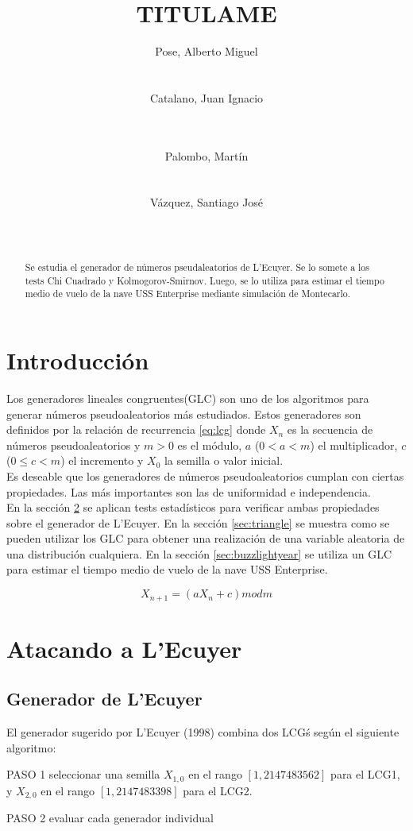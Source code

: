 \documentclass{sig-alternate}
\title{TITULAME}
\author{
\alignauthor
Pose, Alberto Miguel\\
       \affaddr{Instituto Tecnol\'ogico de Buenos Aires}\\
       \affaddr{Buenos Aires, Argentina}\\
       \email{apose@alu.itba.edu.ar}
\alignauthor
Catalano, Juan Ignacio\\
       \affaddr{Instituto Tecnol\'ogico de Buenos Aires}\\
       \affaddr{Buenos Aires, Argentina}\\
       \email{jcatalan@alu.itba.edu.ar}
\and
\alignauthor 
Palombo, Mart\'in\\
       \affaddr{Instituto Tecnol\'ogico de Buenos Aires}\\
       \affaddr{Buenos Aires, Argentina}\\
       \email{mpalombo@alu.itba.edu.ar}
\alignauthor 
V\'azquez, Santiago Jos\'e\\
       \affaddr{Instituto Tecnol\'ogico de Buenos Aires}\\
       \affaddr{Buenos Aires, Argentina}\\
       \email{savazque@alu.itba.edu.ar}
}
\date{}
\begin{document}
\maketitle

\begin{abstract}
Se estudia el generador de n\'umeros pseudaleatorios de L'Ecuyer.
Se lo somete a los tests Chi Cuadrado y Kolmogorov-Smirnov.
Luego, se lo utiliza para estimar el tiempo medio de vuelo de
la nave USS Enterprise mediante simulaci\'on de Montecarlo.
\end{abstract} 

\newpage

\section{Introducci\'on}
Los generadores lineales congruentes(GLC) son uno de los algoritmos
para generar n\'umeros pseudoaleatorios m\'as estudiados.
Estos generadores son definidos por la relaci\'on de recurrencia
\eqref{eq:lcg} donde $X_n$ es la secuencia de n\'umeros pseudoaleatorios y
 $m > 0$ es el m\'odulo, $a$ ($ 0 < a < m$) el multiplicador, $c$ ($0 \leq c < m$)
el incremento y $X_0$ la semilla o valor inicial. \\

Es deseable que los generadores de n\'umeros pseudoaleatorios cumplan
con ciertas propiedades. Las m\'as importantes son las de uniformidad
e independencia. \\

En la secci\'on \ref{sec:goingdown} se aplican tests estad\'isticos para
verificar ambas propiedades sobre el generador de L'Ecuyer. En la secci\'on
\ref{sec:triangle} se muestra como se pueden utilizar los GLC para obtener
una realizaci\'on de una variable aleatoria de una distribuci\'on cualquiera.
En la secci\'on \ref{sec:buzzlightyear} se utiliza un GLC para estimar el
tiempo medio de vuelo de la nave USS Enterprise.

\begin{equation}
\label{eq:lcg}
X_{n+1} = (aX_{n}+c) mod m
\end{equation}

\section{Atacando a L'Ecuyer}
\label{sec:goingdown}

\subsection{Generador de L'Ecuyer}
\label{sec:ecuyer_intro}
El generador sugerido por L'Ecuyer (1998) combina dos LCG\'s seg\'un el
siguiente algoritmo:
\par PASO 1 seleccionar una semilla $X_{1,0}$ en el rango $[1,2147483562]$ para el 
LCG1, y $X_{2,0}$ en el rango $[1,2147483398]$ para el LCG2.
\par PASO 2 evaluar cada generador individual
\end{document}
